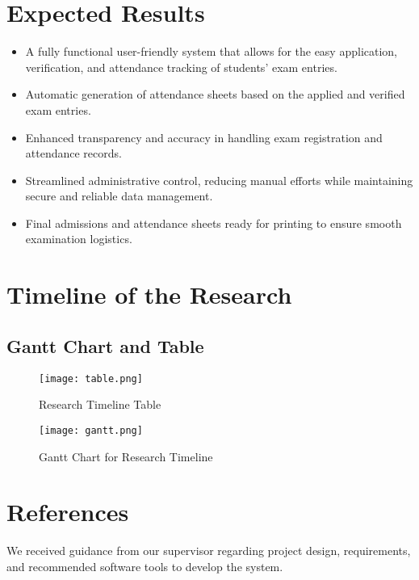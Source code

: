 \documentclass[12pt]{article}
\begin{document}
\newpage

\section{Expected Results}
\justifying
\begin{itemize}
    \item A fully functional user-friendly system that allows for the easy application, verification, and attendance tracking of students' exam entries.
    \item Automatic generation of attendance sheets based on the applied and verified exam entries.
    \item Enhanced transparency and accuracy in handling exam registration and attendance records.
    \item Streamlined administrative control, reducing manual efforts while maintaining secure and reliable data management.
    \item Final admissions and attendance sheets ready for printing to ensure smooth examination logistics.
\end{itemize}

\newpage

\section{Timeline of the Research}
\justifying
\subsection{Gantt Chart and Table}
\begin{figure}[h]
    \centering
    \texttt{[image: table.png]} 
    \caption{Research Timeline Table}
    \label{fig:timeline_table}
\end{figure}

\begin{figure}[h]
    \centering
    \texttt{[image: gantt.png]} 
    \caption{Gantt Chart for Research Timeline}
    \label{fig:timeline_gantt}
\end{figure}

\newpage

\section{References}
\justifying
We received guidance from our supervisor regarding project design, requirements, and recommended software tools to develop the system.\\
\end{document}
